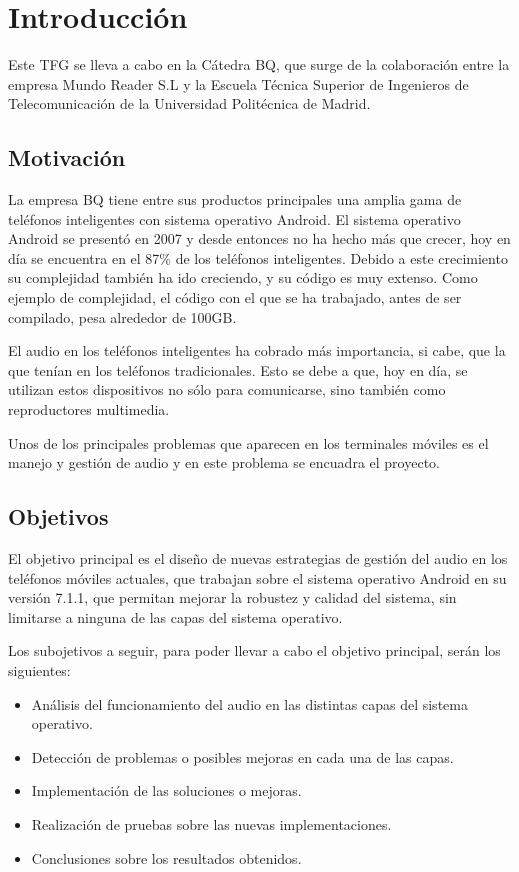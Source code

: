 \chapter{Introducción}
Este \gls{TFG} se lleva a cabo en la Cátedra BQ, que surge de la colaboración entre la empresa Mundo Reader S.L y la Escuela Técnica Superior de Ingenieros de Telecomunicación de la Universidad Politécnica de Madrid.

\section{Motivación}
La empresa BQ tiene entre sus productos principales una amplia gama de teléfonos inteligentes con sistema operativo Android. El sistema operativo Android se presentó en 2007 y desde entonces no ha hecho más que crecer, hoy en día se encuentra en el 87\% de los teléfonos inteligentes. Debido a este crecimiento su complejidad también ha ido creciendo, y su código es muy extenso. Como ejemplo de complejidad, el código con el que se ha trabajado, antes de ser compilado, pesa alrededor de 100\gls{GB}.

El audio en los teléfonos inteligentes ha cobrado más importancia, si cabe, que la que tenían en los teléfonos tradicionales. Esto se debe a que, hoy en día, se utilizan estos dispositivos no sólo para comunicarse, sino también como reproductores multimedia.

Unos de los principales problemas que aparecen en los terminales móviles es el manejo y gestión de audio y en este problema se encuadra el proyecto.

\section{Objetivos}
El objetivo principal es el diseño de nuevas estrategias de gestión del audio en los teléfonos móviles actuales, que trabajan sobre el sistema operativo Android en su versión 7.1.1, que permitan mejorar la robustez y calidad del sistema, sin limitarse a ninguna de las capas del sistema operativo.

Los subojetivos a seguir, para poder llevar a cabo el objetivo principal, serán los siguientes:
\begin{itemize}
	\item{Análisis del funcionamiento del audio en las distintas capas del sistema operativo.}
	\item{Detección de problemas o posibles mejoras en cada una de las capas.}
	\item{Implementación de las soluciones o mejoras.}
	\item{Realización de pruebas sobre las nuevas implementaciones.}
	\item{Conclusiones sobre los resultados obtenidos.}
\end{itemize}

